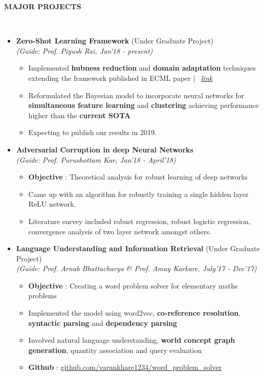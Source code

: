 \documentclass[a4paper,10pt]{article}
\newcommand{\isep}{-2 pt}
\newcommand{\lsep}{-0.5cm}
\newcommand{\resheading}[1]{{\small \colorbox{mygrey}{\begin{minipage}{0.975\textwidth}{\textbf{#1 \vphantom{p\^{E}}}}\end{minipage}}}}
\begin{document}
\resheading{\textbf{MAJOR PROJECTS} }\\[\lsep]

\begin{itemize}
\item \textbf{Zero-Shot Learning Framework} (Under Graduate Project)\\
 \emph{(Guide: Prof. Piyush Rai, Jan'18 - present)} \\[-0.6cm]
	\begin{itemize}\itemsep \isep
	\item Implemented \textbf{hubness reduction} and \textbf{domain adaptation} techniques extending the  framework published in ECML paper | \faGlobe \ \href{https://arxiv.org/pdf/1711.05820.pdf}{\textit{link}} 
	\item Reformulated the Bayesian model to incorporate neural networks for \textbf{simultaneous feature learning} and \textbf{clustering} achieving performance higher than the  \textbf{current SOTA} 
    \item Expecting to publish our results in 2019.
	\end{itemize}
\item \textbf{Adversarial Corruption in deep Neural Networks} \\
 \emph{(Guide: Prof. Purushottam Kar, Jan'18 - April'18)} \\[-0.6cm]
	\begin{itemize}\itemsep \isep
	\item \textbf{Objective} : Theoretical analysis for robust learning of deep networks
	\item Came up with an algorithm for robustly training a single hidden layer ReLU network.
	\item Literature survey included robust regression, robust logistic regression, convergence analysis of two layer network amongst others.
	\end{itemize}
\item \textbf{Language Understanding and Information Retrieval} (Under Graduate Project) \\
 \emph{(Guide: Prof. Arnab Bhattacharya \& Prof. Amay Karkare, July'17 - Dec'17)} \\[-0.6cm]
	\begin{itemize}\itemsep \isep
	\item \textbf{Objective} : Creating a word problem solver for elementary maths problems
	\item Implemented the model using word2vec, \textbf{co-reference resolution}, \textbf{syntactic parsing} and \textbf{dependency parsing}
	\item Involved natural language understanding,\textbf{ world concept graph generation}, quantity association and query evaluation
	\item \textbf{Github} \faGithub  : \href{https://github.com/varunkhare1234/word_problem_solver }{github.com/varunkhare1234/word\_problem\_solver}
	\end{itemize}


\end{itemize}
\end{document}
